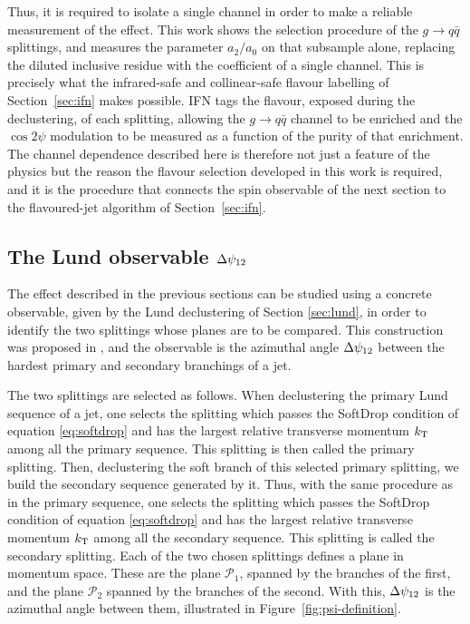 Thus, it is required to isolate a single channel in order to make a reliable measurement
of the effect. This work shows the selection procedure of the $g \to q\bar{q}$ splittings,
and measures the parameter $a_2/a_0$ on that subsample alone, replacing the diluted inclusive
residue with the coefficient of a single channel. This is precisely what the infrared-safe and
collinear-safe flavour labelling of Section~\ref{sec:ifn} makes possible. IFN tags
the flavour, exposed during the declustering, of each splitting, allowing the
$g \to q\bar{q}$ channel to be enriched and the $\cos 2\psi$ modulation to be
measured as a function of the purity of that enrichment. The channel dependence
described here is therefore not just a feature of the physics but the reason the
flavour selection developed in this work is required, and it is the procedure
that connects the spin observable of the next section to the flavoured-jet
algorithm of Section~\ref{sec:ifn}.

\subsection{The Lund observable \texorpdfstring{$\Delta\psi_{12}$}{Delta psi 12}}
\label{sec:spin-dpsi}

The effect described in the previous sections can be studied using a concrete observable,
given by the Lund declustering of Section \ref{sec:lund}, in order to identify
the two splittings whose planes are to be compared. This construction was proposed in
\cite{Karlberg_2021}, and the observable is the azimuthal angle 
$\Delta\psi_{12}$ between the hardest primary and secondary branchings of a jet.

The two splittings are selected as follows. When declustering the primary Lund
sequence of a jet, one selects the splitting which passes the SoftDrop condition
of equation \eqref{eq:softdrop} and has the largest relative transverse momentum
$k_{\mathrm{T}}$ among all the primary sequence. This splitting is then called the primary splitting. 
Then, declustering the soft branch of this selected
primary splitting, we build the secondary sequence generated by it. Thus, with the same
procedure as in the primary sequence, one selects the splitting which passes the SoftDrop
condition of equation \eqref{eq:softdrop} and has the largest relative transverse momentum
$k_{\mathrm{T}}$ among all the secondary sequence. This splitting is called the secondary splitting.
Each of the two chosen splittings defines a plane in momentum space. 
These are the plane $\mathcal{P}_1$, spanned by the branches of the first,
and the plane $\mathcal{P}_2$ spanned by the branches of the second. With this, $\Delta\psi_{12}$ is the
azimuthal angle between them, illustrated in Figure~\ref{fig:psi-definition}.

